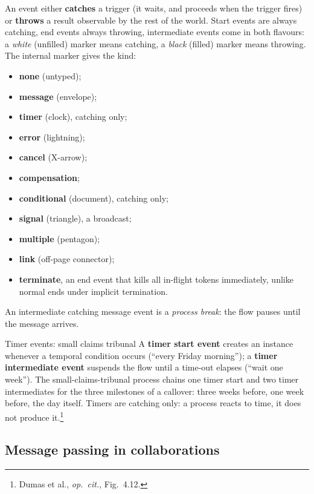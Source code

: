 An event either \textbf{catches} a trigger (it waits, and proceeds when the trigger fires) or \textbf{throws} a result observable by the rest of the world. Start events are always catching, end events always throwing, intermediate events come in both flavours: a \emph{white} (unfilled) marker means catching, a \emph{black} (filled) marker means throwing. The internal marker gives the kind:
\begin{itemize}
  \item \textbf{none} (untyped);
  \item \textbf{message} (envelope);
  \item \textbf{timer} (clock), catching only;
  \item \textbf{error} (lightning);
  \item \textbf{cancel} (X-arrow);
  \item \textbf{compensation};
  \item \textbf{conditional} (document), catching only;
  \item \textbf{signal} (triangle), a broadcast;
  \item \textbf{multiple} (pentagon);
  \item \textbf{link} (off-page connector);
  \item \textbf{terminate}, an end event that kills all in-flight tokens immediately, unlike normal ends under implicit termination.
\end{itemize}

An intermediate catching message event is a \emph{process break}: the flow pauses until the message arrives.

\begin{examplebox}{Timer events: small claims tribunal}
A \textbf{timer start event} creates an instance whenever a temporal condition occurs (``every Friday morning''); a \textbf{timer intermediate event} suspends the flow until a time-out elapses (``wait one week''). The small-claims-tribunal process chains one timer start and two timer intermediates for the three milestones of a callover: three weeks before, one week before, the day itself. Timers are catching only: a process reacts to time, it does not produce it.\footnote{Dumas et al., \emph{op.~cit.}, Fig.~4.12.}
\end{examplebox}

\subsection{Message passing in collaborations}

